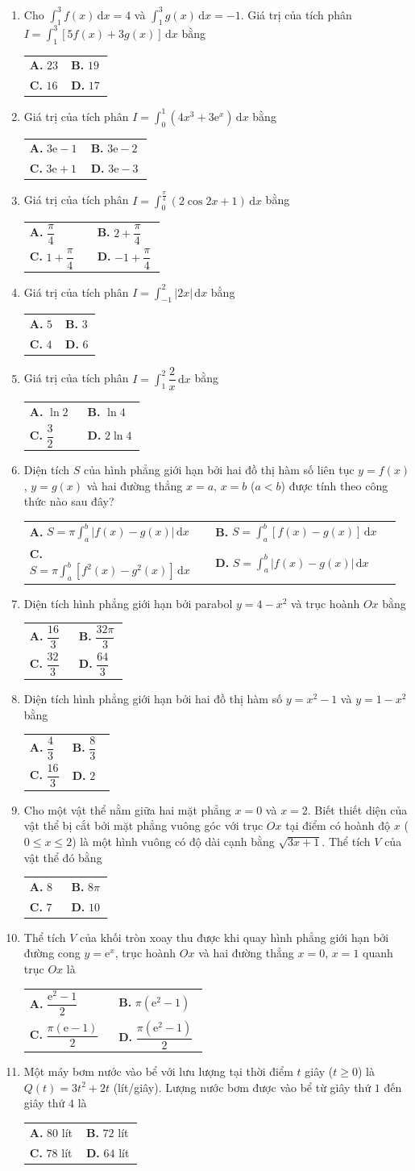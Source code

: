 \documentclass[12pt,a4paper]{article}
\makeatletter
\newcommand{\bonpa}[4]{\par\nobreak\smallskip\nobreak\noindent
\begin{tabular}{@{}p{0.48\linewidth}p{0.48\linewidth}@{}}
\textbf{A.} #1 & \textbf{B.} #2\\[8pt]
\textbf{C.} #3 & \textbf{D.} #4\end{tabular}}
\makeatother
\begin{document}
\begin{enumerate}
\item Cho $\int_1^3 f(x)\,\mathrm{d}x = 4$ và $\int_1^3 g(x)\,\mathrm{d}x = -1$. Giá trị của tích phân $I = \int_1^3 [5f(x) + 3g(x)]\,\mathrm{d}x$ bằng
\bonpa{$23$}{$19$}{$16$}{$17$}

\item Giá trị của tích phân $I = \int_0^1 (4x^3 + 3\mathrm{e}^x)\,\mathrm{d}x$ bằng
\bonpa{$3\mathrm{e} - 1$}{$3\mathrm{e} - 2$}{$3\mathrm{e} + 1$}{$3\mathrm{e} - 3$}

\item Giá trị của tích phân $I = \int_0^{\frac{\pi}{4}} (2\cos 2x + 1)\,\mathrm{d}x$ bằng
\bonpa{$\dfrac{\pi}{4}$}{$2 + \dfrac{\pi}{4}$}{$1 + \dfrac{\pi}{4}$}{$-1 + \dfrac{\pi}{4}$}

\item Giá trị của tích phân $I = \int_{-1}^2 |2x|\,\mathrm{d}x$ bằng
\bonpa{$5$}{$3$}{$4$}{$6$}

\item Giá trị của tích phân $I = \int_1^2 \dfrac{2}{x}\,\mathrm{d}x$ bằng
\bonpa{$\ln 2$}{$\ln 4$}{$\dfrac{3}{2}$}{$2\ln 4$}

\item Diện tích $S$ của hình phẳng giới hạn bởi hai đồ thị hàm số liên tục $y = f(x)$, $y = g(x)$ và hai đường thẳng $x = a$, $x = b$ ($a < b$) được tính theo công thức nào sau đây?
\bonpa{$S = \pi\int_a^b |f(x) - g(x)|\,\mathrm{d}x$}{$S = \int_a^b [f(x) - g(x)]\,\mathrm{d}x$}{$S = \pi\int_a^b [f^2(x) - g^2(x)]\,\mathrm{d}x$}{$S = \int_a^b |f(x) - g(x)|\,\mathrm{d}x$}

\item Diện tích hình phẳng giới hạn bởi parabol $y = 4 - x^2$ và trục hoành $Ox$ bằng
\bonpa{$\dfrac{16}{3}$}{$\dfrac{32\pi}{3}$}{$\dfrac{32}{3}$}{$\dfrac{64}{3}$}

\item Diện tích hình phẳng giới hạn bởi hai đồ thị hàm số $y = x^2 - 1$ và $y = 1 - x^2$ bằng
\bonpa{$\dfrac{4}{3}$}{$\dfrac{8}{3}$}{$\dfrac{16}{3}$}{$2$}

\item Cho một vật thể nằm giữa hai mặt phẳng $x = 0$ và $x = 2$. Biết thiết diện của vật thể bị cắt bởi mặt phẳng vuông góc với trục $Ox$ tại điểm có hoành độ $x$ ($0 \le x \le 2$) là một hình vuông có độ dài cạnh bằng $\sqrt{3x + 1}$. Thể tích $V$ của vật thể đó bằng
\bonpa{$8$}{$8\pi$}{$7$}{$10$}

\item Thể tích $V$ của khối tròn xoay thu được khi quay hình phẳng giới hạn bởi đường cong $y = \mathrm{e}^x$, trục hoành $Ox$ và hai đường thẳng $x = 0$, $x = 1$ quanh trục $Ox$ là
\bonpa{$\dfrac{\mathrm{e}^2 - 1}{2}$}{$\pi(\mathrm{e}^2 - 1)$}{$\dfrac{\pi(\mathrm{e} - 1)}{2}$}{$\dfrac{\pi(\mathrm{e}^2 - 1)}{2}$}

\item Một máy bơm nước vào bể với lưu lượng tại thời điểm $t$ giây ($t \ge 0$) là $Q(t) = 3t^2 + 2t$ (lít/giây). Lượng nước bơm được vào bể từ giây thứ $1$ đến giây thứ $4$ là
\bonpa{$80$ lít}{$72$ lít}{$78$ lít}{$64$ lít}
\end{enumerate}
\end{document}
